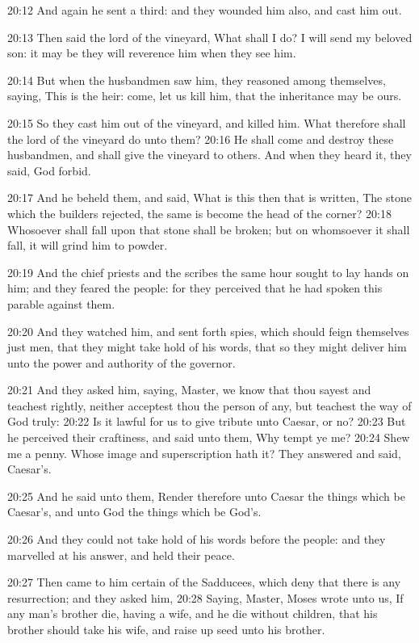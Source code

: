 20:12 And again he sent a third: and they wounded him also, and cast him out.

20:13 Then said the lord of the vineyard, What shall I do? I will send my beloved son: it may be they will reverence him when they see him.

20:14 But when the husbandmen saw him, they reasoned among themselves, saying, This is the heir: come, let us kill him, that the inheritance may be ours.

20:15 So they cast him out of the vineyard, and killed him. What therefore shall the lord of the vineyard do unto them?  20:16 He shall come and destroy these husbandmen, and shall give the vineyard to others. And when they heard it, they said, God forbid.

20:17 And he beheld them, and said, What is this then that is written, The stone which the builders rejected, the same is become the head of the corner?  20:18 Whosoever shall fall upon that stone shall be broken; but on whomsoever it shall fall, it will grind him to powder.

20:19 And the chief priests and the scribes the same hour sought to lay hands on him; and they feared the people: for they perceived that he had spoken this parable against them.

20:20 And they watched him, and sent forth spies, which should feign themselves just men, that they might take hold of his words, that so they might deliver him unto the power and authority of the governor.

20:21 And they asked him, saying, Master, we know that thou sayest and teachest rightly, neither acceptest thou the person of any, but teachest the way of God truly: 20:22 Is it lawful for us to give tribute unto Caesar, or no?  20:23 But he perceived their craftiness, and said unto them, Why tempt ye me?  20:24 Shew me a penny. Whose image and superscription hath it? They answered and said, Caesar's.

20:25 And he said unto them, Render therefore unto Caesar the things which be Caesar's, and unto God the things which be God's.

20:26 And they could not take hold of his words before the people: and they marvelled at his answer, and held their peace.

20:27 Then came to him certain of the Sadducees, which deny that there is any resurrection; and they asked him, 20:28 Saying, Master, Moses wrote unto us, If any man's brother die, having a wife, and he die without children, that his brother should take his wife, and raise up seed unto his brother.

